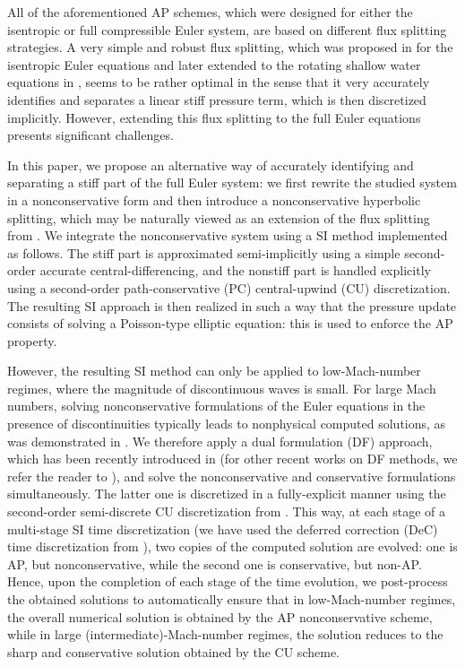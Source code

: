 \documentclass[A4paper,12pt,twoside]{article}
\numberwithin{equation}{section}
\numberwithin{figure}{section}
\numberwithin{table}{section}
\begin{document}
All of the aforementioned AP schemes, which were designed for either the isentropic or full compressible Euler system, are based on 
different flux splitting strategies.  A very simple and robust flux splitting, which was proposed in \cite{haack2012all} for the isentropic 
Euler equations and later extended to the rotating shallow water equations in \cite{LCK}, seems to be rather optimal in the sense that
it very accurately identifies and separates a linear stiff pressure term, which is then discretized implicitly. However, extending this 
flux splitting to the full Euler equations presents significant challenges. 

In this paper, we propose an alternative way of accurately identifying and separating a stiff part of the full Euler system: we first
rewrite the studied system in a nonconservative form and then introduce a nonconservative hyperbolic splitting, which may be naturally
viewed as an extension of the flux splitting from \cite{haack2012all}. We integrate the nonconservative system using a SI method 
implemented as follows. The stiff part is approximated semi-implicitly using a simple second-order accurate central-differencing, and the 
nonstiff part is handled explicitly using a second-order path-conservative (PC) central-upwind (CU) discretization. The resulting SI 
approach is then realized in such a way that the pressure update consists of solving a Poisson-type elliptic equation: this is used to 
enforce the AP property.

However, the resulting SI method can only be applied to low-Mach-number regimes, where the magnitude of discontinuous waves is small.
For large Mach numbers, solving nonconservative formulations of the Euler equations in the presence of discontinuities typically leads to
nonphysical computed solutions, as was demonstrated in \cite{abgrall2010comment,HouLeF}. We therefore apply a dual formulation (DF)
approach, which has been recently introduced in \cite{CFKM} (for other recent works on DF methods, we refer the reader to
\cite{Abg2023,ACKM,AbgLiu,pidatella2019semi}), and solve the nonconservative and conservative formulations simultaneously. The latter one is
discretized in a fully-explicit manner using the second-order semi-discrete CU discretization from \cite{KLin}. This way, at each stage of a
multi-stage SI time discretization (we have used the deferred correction (DeC) time discretization from \cite{offner2025analysis}), two
copies of the computed solution are evolved: one is AP, but nonconservative, while the second one is conservative, but non-AP. Hence, 
upon the completion of each stage of the time evolution, we post-process the obtained solutions to automatically ensure that in
low-Mach-number regimes, the overall numerical solution is obtained by the AP nonconservative scheme, while in large
(intermediate)-Mach-number regimes, the solution reduces to the sharp and conservative solution obtained by the CU scheme.
\end{document}
